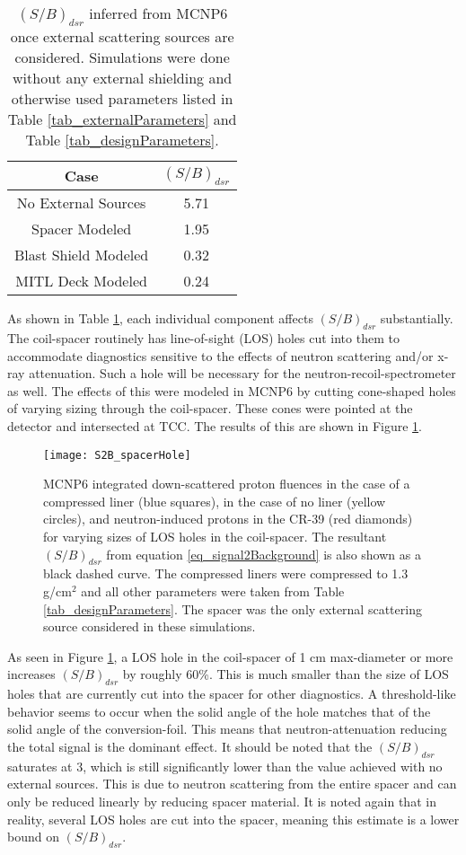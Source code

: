 \begin{table}[!h]
	\caption{ $(S/B)_{dsr}$ inferred from MCNP6 once external scattering sources are considered. Simulations were done without any external shielding and otherwise used parameters listed in Table \ref{tab_externalParameters} and Table \ref{tab_designParameters}. }
	\label{tab_externalS2B}
	\renewcommand{\arraystretch}{1.5} 
	\begin{tabular}{  c | c  }
		Case & $(S/B)_{dsr}$ \\\hline
		No External Sources & 5.71 \\
		Spacer Modeled & 1.95 \\
		Blast Shield Modeled	& 0.32 \\
		MITL Deck Modeled	& 0.24
	\end{tabular}		
\end{table}

As shown in Table \ref{tab_externalS2B}, each individual component affects $(S/B)_{dsr}$ substantially. The coil-spacer routinely has line-of-sight (LOS) holes cut into them to accommodate diagnostics sensitive to the effects of neutron scattering and/or x-ray attenuation. Such a hole will be necessary for the neutron-recoil-spectrometer as well. The effects of this were modeled in MCNP6 by cutting cone-shaped holes of varying sizing through the coil-spacer. These cones were pointed at the detector and intersected at TCC. The results of this are shown in Figure \ref{fig_spacerLoS}.

\begin{figure}[h!]
	
	\centering
	\texttt{[image: S2B\_spacerHole]}
	\caption{MCNP6 integrated down-scattered proton fluences in the case of a compressed liner (blue squares), in the case of no liner (yellow circles), and neutron-induced protons in the CR-39 (red diamonds) for varying sizes of LOS holes in the coil-spacer. The resultant $(S/B)_{dsr}$ from equation \ref{eq_signal2Background} is also shown as a black dashed curve. The compressed liners were compressed to 1.3 g/cm$^2$ and all other parameters were taken from Table \ref{tab_designParameters}. The spacer was the only external scattering source considered in these simulations.}
	\label{fig_spacerLoS}
	
\end{figure}

As seen in Figure \ref{fig_spacerLoS}, a LOS hole in the coil-spacer of 1 cm max-diameter or more increases $(S/B)_{dsr}$ by roughly 60\%. This is much smaller than the size of LOS holes that are currently cut into the spacer for other diagnostics. A threshold-like behavior seems to occur when the solid angle of the hole matches that of the solid angle of the conversion-foil. This means that neutron-attenuation reducing the total signal is the dominant effect. It should be noted that the $(S/B)_{dsr}$ saturates at 3, which is still significantly lower than the value achieved with no external sources. This is due to neutron scattering from the entire spacer and can only be reduced linearly by reducing spacer material. It is noted again that in reality, several LOS holes are cut into the spacer, meaning this estimate is a lower bound on $(S/B)_{dsr}$.  

